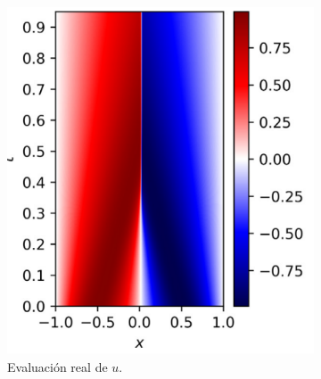 \begin{figure}[htbp]
\begin{subfigure}{0.3\textwidth}
    \includegraphics[width=\linewidth]{img/img29.png}
    \caption{Evaluación real de $u$.}
    \label{fig:img29}
    \end{subfigure}
    \begin{subfigure}{0.235\textwidth}
    \centering

\end{subfigure}
\end{figure}
